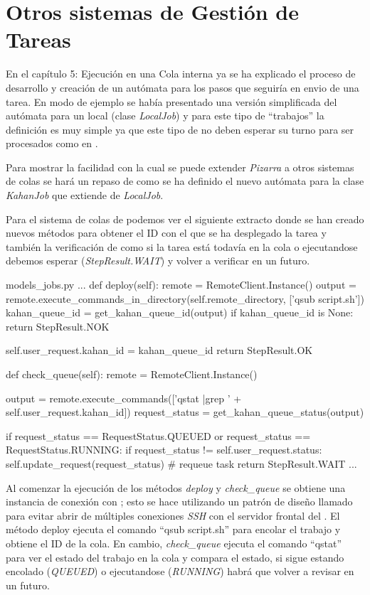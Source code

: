 \documentclass[11pt,spanish,listoffigures,listoftables]{tfgetsinf}
\begin{document}
\section{Otros sistemas de Gestión de Tareas}

En el capítulo 5: Ejecución en una Cola interna ya se ha explicado el proceso de desarrollo y creación de un autómata para los pasos que seguiría en \gls{envio} de una \gls{tarea}. En modo de ejemplo se había presentado una versión simplificada del autómata para un  local (clase \textit{LocalJob}) y para este tipo de ``trabajos'' la definición es muy simple ya que este tipo de  no deben esperar su turno para ser procesados como en \kahan.

Para mostrar la facilidad con la cual se puede extender \textit{Pizarra} a otros sistemas de \gls{cola}s se hará un repaso de como se ha definido el nuevo autómata para la clase \textit{KahanJob} que extiende de \textit{LocalJob}.

Para el sistema de \Gls{cola}s de \kahan podemos ver el siguiente extracto donde se han creado nuevos métodos para obtener el ID con el que se ha desplegado la tarea y también la verificación de como si la tarea está todavía en la \gls{cola} o ejecutandose debemos esperar (\textit{StepResult.WAIT}) y volver a verificar en un futuro. \newline

\begin{code}{models\_jobs.py}
...
def deploy(self):
	remote = RemoteClient.Instance()
	output = remote.execute_commands_in_directory(self.remote_directory, ['qsub script.sh'])
	kahan_queue_id = get_kahan_queue_id(output)
	if kahan_queue_id is None:
		return StepResult.NOK
	
	self.user_request.kahan_id = kahan_queue_id
	return StepResult.OK

def check_queue(self):
	remote = RemoteClient.Instance()
		
	output = remote.execute_commands(['qstat |grep ' + self.user_request.kahan_id])
	request_status = get_kahan_queue_status(output)
	
	if request_status == RequestStatus.QUEUED or request_status == RequestStatus.RUNNING:
		if request_status != self.user_request.status:
			self.update_request(request_status)
		# requeue task
		return StepResult.WAIT
...
\end{code}

Al comenzar la ejecución de los métodos \textit{deploy} y \textit{check\_queue} se obtiene una instancia de conexión con \kahan; esto se hace utilizando un patrón de diseño llamado  \cite{book-software-design-patterns} para evitar abrir de múltiples conexiones \textit{SSH} con el servidor frontal del . El método deploy ejecuta el comando ``qsub script.sh'' para encolar el trabajo y obtiene el ID de la \gls{cola}. En cambio, \textit{check\_queue} ejecuta el comando ``qstat'' para ver el estado del trabajo en la \gls{cola} y compara el estado, si sigue estando encolado (\textit{QUEUED}) o ejecutandose (\textit{RUNNING}) habrá que volver a revisar en un futuro.
\end{document}
